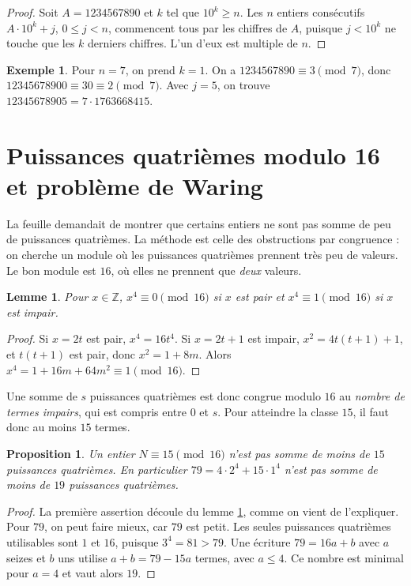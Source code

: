\documentclass[11pt,a4paper]{article}
\theoremstyle{plain}
\newtheorem{proposition}[theoreme]{Proposition}
\newtheorem{lemme}[theoreme]{Lemme}
\theoremstyle{definition}
\newtheorem{exemple}[theoreme]{Exemple}
\theoremstyle{remark}
\newcommand{\Z}{\mathbb{Z}}
\begin{document}
\begin{proof}
Soit $A=1234567890$ et $k$ tel que $10^k\geq n$. Les $n$ entiers consécutifs $A\cdot10^k+j$, $0\leq j<n$, commencent tous par les chiffres de $A$, puisque $j<10^k$ ne touche que les $k$ derniers chiffres. L'un d'eux est multiple de $n$.
\end{proof}

\begin{exemple}
Pour $n=7$, on prend $k=1$. On a $1234567890\equiv3\pmod7$, donc $12345678900\equiv30\equiv2\pmod 7$. Avec $j=5$, on trouve $12345678905=7\cdot1763668415$.
\end{exemple}

\section{Puissances quatrièmes modulo 16 et problème de Waring}

La feuille demandait de montrer que certains entiers ne sont pas somme de peu de puissances quatrièmes. La méthode est celle des obstructions par congruence : on cherche un module où les puissances quatrièmes prennent très peu de valeurs. Le bon module est $16$, où elles ne prennent que \emph{deux} valeurs.

\begin{lemme}\label{lem:mod16}
Pour $x\in\Z$, $x^4\equiv0\pmod{16}$ si $x$ est pair et $x^4\equiv1\pmod{16}$ si $x$ est impair.
\end{lemme}

\begin{proof}
Si $x=2t$ est pair, $x^4=16t^4$. Si $x=2t+1$ est impair, $x^2=4t(t+1)+1$, et $t(t+1)$ est pair, donc $x^2=1+8m$. Alors $x^4=1+16m+64m^2\equiv1\pmod{16}$.
\end{proof}

Une somme de $s$ puissances quatrièmes est donc congrue modulo $16$ au \emph{nombre de termes impairs}, qui est compris entre $0$ et $s$. Pour atteindre la classe $15$, il faut donc au moins $15$ termes.

\begin{proposition}\label{prop:waring15}
Un entier $N\equiv15\pmod{16}$ n'est pas somme de moins de $15$ puissances quatrièmes. En particulier $79=4\cdot2^4+15\cdot1^4$ n'est pas somme de moins de $19$ puissances quatrièmes.
\end{proposition}

\begin{proof}
La première assertion découle du lemme \ref{lem:mod16}, comme on vient de l'expliquer. Pour $79$, on peut faire mieux, car $79$ est petit. Les seules puissances quatrièmes utilisables sont $1$ et $16$, puisque $3^4=81>79$. Une écriture $79=16a+b$ avec $a$ seizes et $b$ uns utilise $a+b=79-15a$ termes, avec $a\leq4$. Ce nombre est minimal pour $a=4$ et vaut alors $19$.
\end{proof}
\end{document}
